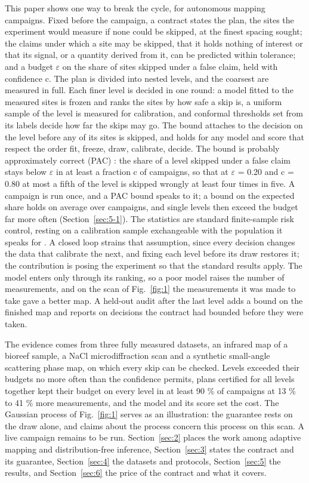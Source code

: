 \documentclass{iopjournal}
\begin{document}
This paper shows one way to break the cycle, for autonomous mapping campaigns. Fixed before the campaign, a contract states the plan, the sites the experiment would measure if none could be skipped, at the finest spacing sought; the claims under which a site may be skipped, that it holds nothing of interest or that its signal, or a quantity derived from it, can be predicted within tolerance; and a budget \ensuremath{\varepsilon} on the share of sites skipped under a false claim, held with confidence c. The plan is divided into nested levels, and the coarsest are measured in full. Each finer level is decided in one round: a model fitted to the measured sites is frozen and ranks the sites by how safe a skip is, a uniform sample of the level is measured for calibration, and conformal thresholds set from its labels decide how far the skips may go. The bound attaches to the decision on the level before any of its sites is skipped, and holds for any model and score that respect the order fit, freeze, draw, calibrate, decide. The bound is probably approximately correct (PAC) \cite{Valiant1984}: the share of a level skipped under a false claim stays below \ensuremath{\varepsilon} in at least a fraction c of campaigns, so that at \ensuremath{\varepsilon} = 0.20 and c = 0.80 at most a fifth of the level is skipped wrongly at least four times in five. A campaign is run once, and a PAC bound speaks to it; a bound on the expected share holds on average over campaigns, and single levels then exceed the budget far more often (Section~\ref{sec:5-1}). The statistics are standard finite-sample risk control, resting on a calibration sample exchangeable with the population it speaks for \cite{Vovk2005,Bates2021,Angelopoulos2025}. A closed loop strains that assumption, since every decision changes the data that calibrate the next, and fixing each level before its draw restores it; the contribution is posing the experiment so that the standard results apply. The model enters only through its ranking, so a poor model raises the number of measurements, and on the scan of Fig.~\ref{fig:1} the measurements it was made to take gave a better map. A held-out audit after the last level adds a bound on the finished map and reports on decisions the contract had bounded before they were taken.

The evidence comes from three fully measured datasets, an infrared map of a bioreef sample, a NaCl microdiffraction scan \cite{ALSNaCl} and a synthetic small-angle scattering phase map, on which every skip can be checked. Levels exceeded their budgets no more often than the confidence permits, plans certified for all levels together kept their budget on every level in at least 90 \% of campaigns at 13 \% to 41 \% more measurements, and the model and its score set the cost. The Gaussian process of Fig.~\ref{fig:1} serves as an illustration: the guarantee rests on the draw alone, and claims about the process concern this process on this scan. A live campaign remains to be run. Section~\ref{sec:2} places the work among adaptive mapping and distribution-free inference, Section~\ref{sec:3} states the contract and its guarantee, Section~\ref{sec:4} the datasets and protocols, Section~\ref{sec:5} the results, and Section~\ref{sec:6} the price of the contract and what it covers.
\end{document}
